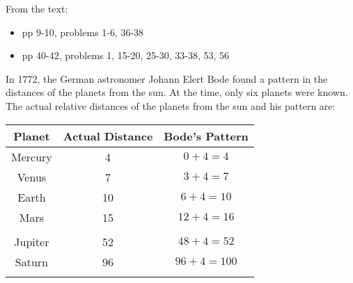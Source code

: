 \documentclass[fleqn,addpoints]{exam}
\begin{document}
\begin{questions}

\question

From the text:
\begin{itemize}

  \item pp 9-10, problems 1-6, 36-38

  \item pp 40-42, problems 1, 15-20, 25-30, 33-38, 53, 56

\end{itemize}

\question

In 1772, the German astronomer Johann Elert Bode found a pattern in the distances of the planets from the sun.  At the
time, only six planets were known.  The actual relative distances of the planets from the sun and his pattern are:

\vspace{0.5 cm}
  \begin{tabular}{|c|c|c|}
    \hline
    Planet  & Actual Distance & Bode's Pattern \\ 
    \hline
    Mercury & 4               & \( 0 + 4 = 4 \) \\
    Venus   & 7               & \( 3 + 4 = 7 \) \\
    Earth   & 10              & \( 6 + 4 = 10 \) \\
    Mars    & 15              & \( 12 + 4 = 16 \) \\
            &                 &  \\
    Jupiter & 52              & \( 48 + 4 = 52 \) \\
    Saturn  & 96              & \( 96 + 4 = 100 \) \\
            &                 &  \\
    \hline
  \end{tabular}
\vspace{0.5 cm}

\end{questions}
\end{document}

